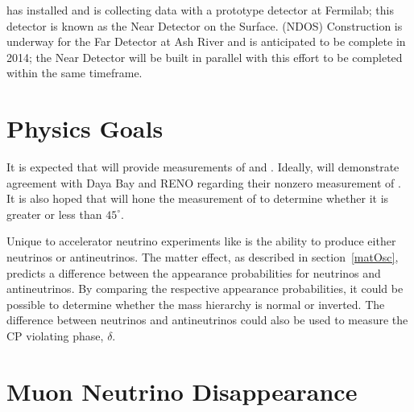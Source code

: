 \nova has installed and is collecting data with a prototype detector at Fermilab; this detector is known as the Near Detector on the Surface.  (NDOS)  Construction is underway for the Far Detector at Ash River and is anticipated to be complete in 2014; the Near Detector will be built in parallel with this effort to be completed within the same timeframe.  

\section{Physics Goals}
\label{goals}

It is expected that \nova will provide measurements of  \thetaoth and \thetatth.  Ideally, \nova will demonstrate agreement with Daya Bay and RENO regarding their nonzero measurement of \thetaoth.  It is also hoped that \nova will  hone the measurement of \thetatth to determine whether it is greater or less than $45^\circ$.  

Unique to accelerator neutrino experiments like \nova is the ability to produce either neutrinos or antineutrinos.  The matter effect, as described in section~\ref{matOsc}, predicts a difference between the appearance probabilities for neutrinos and antineutrinos.   By comparing the respective appearance probabilities, it could be possible to determine whether the mass hierarchy is normal or inverted.  The difference between neutrinos and antineutrinos could also be used to measure the CP violating phase, $\delta$.  

\section{Muon Neutrino Disappearance}

